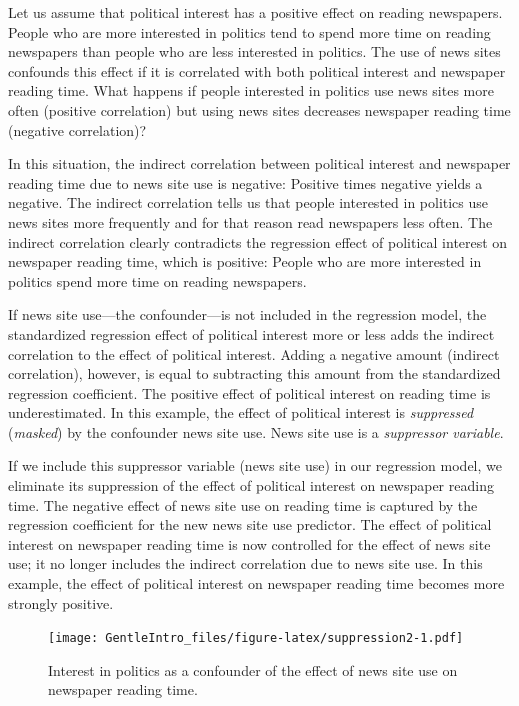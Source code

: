 \documentclass[a4paper]{book}
\theoremstyle{definition}
\theoremstyle{definition}
\theoremstyle{definition}
\theoremstyle{remark}
\begin{document}
Let us assume that political interest has a positive effect on reading
newspapers. People who are more interested in politics tend to spend
more time on reading newspapers than people who are less interested in
politics. The use of news sites confounds this effect if it is
correlated with both political interest and newspaper reading time. What
happens if people interested in politics use news sites more often
(positive correlation) but using news sites decreases newspaper reading
time (negative correlation)?

In this situation, the indirect correlation between political interest
and newspaper reading time due to news site use is negative: Positive
times negative yields a negative. The indirect correlation tells us that
people interested in politics use news sites more frequently and for
that reason read newspapers less often. The indirect correlation clearly
contradicts the regression effect of political interest on newspaper
reading time, which is positive: People who are more interested in
politics spend more time on reading newspapers.

If news site use---the confounder---is not included in the regression
model, the standardized regression effect of political interest more or
less adds the indirect correlation to the effect of political interest.
Adding a negative amount (indirect correlation), however, is equal to
subtracting this amount from the standardized regression coefficient.
The positive effect of political interest on reading time is
underestimated. In this example, the effect of political interest is
\emph{suppressed} (\emph{masked}) by the confounder news site use. News
site use is a \emph{suppressor variable}.

If we include this suppressor variable (news site use) in our regression
model, we eliminate its suppression of the effect of political interest
on newspaper reading time. The negative effect of news site use on
reading time is captured by the regression coefficient for the new news
site use predictor. The effect of political interest on newspaper
reading time is now controlled for the effect of news site use; it no
longer includes the indirect correlation due to news site use. In this
example, the effect of political interest on newspaper reading time
becomes more strongly positive.

\begin{figure}
\centering
\texttt{[image: GentleIntro\_files/figure-latex/suppression2-1.pdf]}
\caption{\label{fig:suppression2}Interest in politics as a confounder of the
effect of news site use on newspaper reading time.}
\end{figure}
\end{document}
